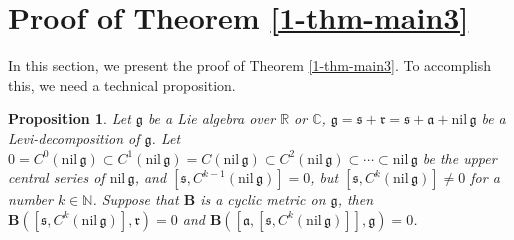 \documentclass[reqno]{amsart}
\newtheorem{prop}[thm]{Proposition}
\theoremstyle{definition}
\begin{document}
\section{Proof of Theorem \ref{1-thm-main3}}\label{sec5}
In this section, we present the proof of Theorem \ref{1-thm-main3}. To accomplish this, we need a technical proposition.
\begin{prop}\label{6-prop-a}
Let $\mathfrak{g}$ be a Lie algebra over $\mathbb{R}$ or $\mathbb{C}$,
$\mathfrak{g}=\mathfrak{s}+\mathfrak{r}=\mathfrak{s}+\mathfrak{a}+\mathrm{nil}\,\mathfrak{g}$ be a Levi-decomposition of $\mathfrak{g}$.
Let $0=C^{0}(\mathrm{nil}\,\mathfrak{g}) \subset C^{1}(\mathrm{nil}\,\mathfrak{g})=C(\mathrm{nil}\,\mathfrak{g})\subset C^{2}(\mathrm{nil}\,\mathfrak{g})\subset\cdots\subset\mathrm{nil}\,\mathfrak{g}$ be the upper central series of $\mathrm{nil}\,\mathfrak{g}$, and $[\mathfrak{s},C^{k-1}(\mathrm{nil}\,\mathfrak{g})]=0$, but $[\mathfrak{s},C^{k}(\mathrm{nil}\,\mathfrak{g})]\neq0$ for a number $k\in \mathbb{N}$. Suppose  that $\mathbf{B}$ is a cyclic metric on $\mathfrak{g}$,
then $\mathbf{B}([\mathfrak{s},C^{k}(\mathrm{nil}\,\mathfrak{g})],\mathfrak{r})=0$ and
$\mathbf{B}([\mathfrak{a},[\mathfrak{s},C^{k}(\mathrm{nil}\,\mathfrak{g})]],\mathfrak{g})=0$.
\end{prop}
\end{document}
